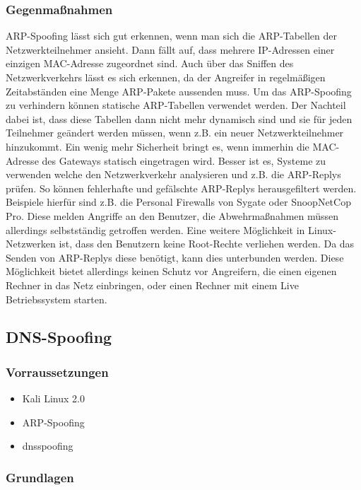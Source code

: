 \subsubsection{Gegenmaßnahmen}
ARP-Spoofing lässt sich gut erkennen, wenn man sich die ARP-Tabellen der Netzwerkteilnehmer ansieht. Dann fällt auf, dass mehrere IP-Adressen einer einzigen MAC-Adresse zugeordnet sind. Auch über das Sniffen des Netzwerkverkehrs lässt es sich erkennen, da der Angreifer in regelmäßigen Zeitabständen eine Menge ARP-Pakete aussenden muss.
Um das ARP-Spoofing zu verhindern können statische ARP-Tabellen verwendet werden. Der Nachteil dabei ist, dass diese Tabellen dann nicht mehr dynamisch sind und sie für jeden Teilnehmer geändert werden müssen, wenn z.B. ein neuer Netzwerkteilnehmer hinzukommt. Ein wenig mehr Sicherheit bringt es, wenn immerhin die MAC-Adresse des Gateways statisch eingetragen wird.
Besser ist es, Systeme zu verwenden welche den Netzwerkverkehr analysieren und z.B. die ARP-Replys prüfen. So können fehlerhafte und gefälschte ARP-Replys herausgefiltert werden. Beispiele hierfür sind z.B. die Personal Firewalls von Sygate oder SnoopNetCop Pro. Diese melden Angriffe an den Benutzer, die Abwehrmaßnahmen müssen allerdings selbstständig getroffen werden.
Eine weitere Möglichkeit in Linux-Netzwerken ist, dass den Benutzern keine Root-Rechte verliehen werden. Da das Senden von ARP-Replys diese benötigt, kann dies unterbunden werden. Diese Möglichkeit bietet allerdings keinen Schutz vor Angreifern, die einen eigenen Rechner in das Netz einbringen, oder einen Rechner mit einem Live Betriebssystem starten. 


\subsection{DNS-Spoofing}

\subsubsection*{Vorraussetzungen}

\begin{itemize}
\item Kali Linux 2.0
\item ARP-Spoofing
\item dnsspoofing
\end{itemize}


\subsubsection*{Grundlagen}

